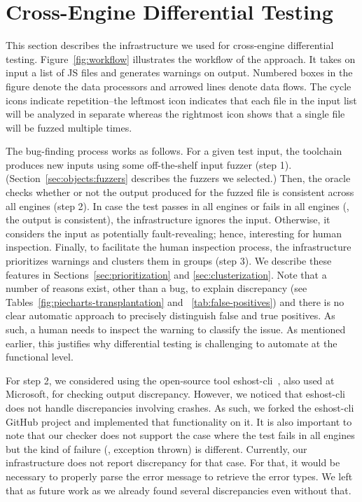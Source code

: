 \documentclass[smallextended]{svjour3}
\begin{document}
\section{Cross-Engine Differential Testing}
\label{sec:design}

This section describes the infrastructure we used for cross-engine
differential testing. Figure~\ref{fig:workflow} illustrates the
workflow of the approach. It takes on input a list of JS files and
generates warnings on output. Numbered boxes in the figure denote the
data processors and arrowed lines denote data flows. The cycle icons
indicate repetition--the leftmost icon indicates that each file in the
input list will be analyzed in separate whereas the rightmost icon
shows that a single file will be fuzzed multiple times.

The bug-finding process works as follows. For a given test input, the
toolchain produces new inputs using some off-the-shelf input fuzzer
(step 1).  (Section~\ref{sec:objects:fuzzers} describes the fuzzers we
selected.)  Then, the oracle checks whether or not the output produced
for the fuzzed file is consistent across all engines (step 2). In case
the test passes in all engines or fails in all engines (\ie{}, the
output is consistent), the infrastructure ignores the
input. Otherwise, it considers the input as potentially
fault-revealing; hence, interesting for human inspection. Finally, to
facilitate the human inspection process, the infrastructure
prioritizes warnings and clusters them in groups (step 3). We describe
these features in Sections~\ref{sec:prioritization} and
\ref{sec:clusterization}. Note that a number of reasons exist, other
than a bug, to explain discrepancy (see
Tables~\ref{fig:piecharts-transplantation} and
~\ref{tab:false-positives}) and there is no clear automatic approach
to precisely distinguish false and true positives. As such, a human
needs to inspect the warning to classify the issue. As mentioned
earlier, this justifies why differential testing is challenging to
automate at the functional level.

For step 2, we considered using the open-source tool
eshost-cli~\cite{eshost-cli}, also used at Microsoft, for checking
output discrepancy. However, we noticed that eshost-cli does not
handle discrepancies involving crashes. As such, we forked the
eshost-cli GitHub project and implemented that functionality on it. It
is also important to note that our checker does not support the case
where the test fails in all engines but the kind of failure (\eg{},
exception thrown) is different. Currently, our infrastructure does not
report discrepancy for that case. For that, it would be necessary to
properly parse the error message to retrieve the error types. We left
that as future work as we already found several discrepancies even
without that.
\end{document}
